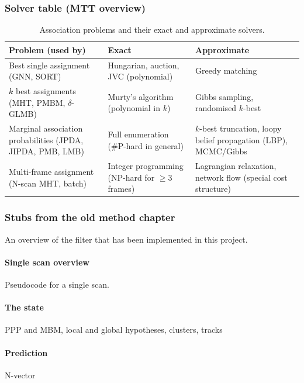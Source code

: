 \subsubsection{Solver table (MTT overview)}
\begin{table}[htbp]
\centering\small
\caption{Association problems and their exact and approximate solvers.
  }
\label{tab:solvers}
\begin{tabularx}{\textwidth}{>{\raggedright\arraybackslash}p{3.3cm} >{\raggedright\arraybackslash}p{3.6cm} X}
\toprule
Problem (used by) & Exact & Approximate \\
\midrule
Best single assignment (GNN, SORT) & Hungarian, auction, JVC (polynomial) & Greedy matching \\
$k$ best assignments (MHT, PMBM, $\delta$-GLMB) & Murty's algorithm (polynomial in $k$) & Gibbs sampling, randomised $k$-best \\
Marginal association probabilities (JPDA, JIPDA, PMB, LMB) & Full enumeration (\#P-hard in general) & $k$-best truncation, loopy belief propagation (LBP), MCMC/Gibbs \\
Multi-frame assignment (N-scan MHT, batch) & Integer programming (NP-hard for $\geq 3$ frames) & Lagrangian relaxation, network flow (special cost structure) \\
\bottomrule
\end{tabularx}
\end{table}

\subsubsection{Stubs from the old method chapter}
An overview of the filter that has been implemented in this project.

\paragraph{Single scan overview}
Pseudocode for a single scan.

\paragraph{The state}
PPP and MBM, local and global hypotheses, clusters, tracks

\paragraph{Prediction}
N-vector

